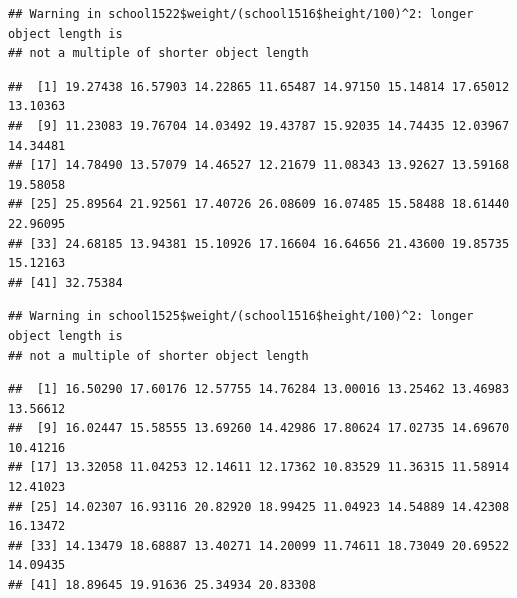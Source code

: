 \documentclass[
  12pt,
]{book}
\newenvironment{Shaded}{\begin{snugshade}}{\end{snugshade}}
\newcommand{\DecValTok}[1]{\textcolor[rgb]{0.00,0.00,0.81}{#1}}
\newcommand{\DocumentationTok}[1]{\textcolor[rgb]{0.56,0.35,0.01}{\textbf{\textit{#1}}}}
\newcommand{\NormalTok}[1]{#1}
\newcommand{\SpecialCharTok}[1]{\textcolor[rgb]{0.00,0.00,0.00}{#1}}
\begin{document}
\begin{Shaded}
\end{Shaded}

\begin{verbatim}
## Warning in school1522$weight/(school1516$height/100)^2: longer object length is
## not a multiple of shorter object length
\end{verbatim}

\begin{verbatim}
##  [1] 19.27438 16.57903 14.22865 11.65487 14.97150 15.14814 17.65012 13.10363
##  [9] 11.23083 19.76704 14.03492 19.43787 15.92035 14.74435 12.03967 14.34481
## [17] 14.78490 13.57079 14.46527 12.21679 11.08343 13.92627 13.59168 19.58058
## [25] 25.89564 21.92561 17.40726 26.08609 16.07485 15.58488 18.61440 22.96095
## [33] 24.68185 13.94381 15.10926 17.16604 16.64656 21.43600 19.85735 15.12163
## [41] 32.75384
\end{verbatim}

\begin{Shaded}
\end{Shaded}

\begin{verbatim}
## Warning in school1525$weight/(school1516$height/100)^2: longer object length is
## not a multiple of shorter object length
\end{verbatim}

\begin{verbatim}
##  [1] 16.50290 17.60176 12.57755 14.76284 13.00016 13.25462 13.46983 13.56612
##  [9] 16.02447 15.58555 13.69260 14.42986 17.80624 17.02735 14.69670 10.41216
## [17] 13.32058 11.04253 12.14611 12.17362 10.83529 11.36315 11.58914 12.41023
## [25] 14.02307 16.93116 20.82920 18.99425 11.04923 14.54889 14.42308 16.13472
## [33] 14.13479 18.68887 13.40271 14.20099 11.74611 18.73049 20.69522 14.09435
## [41] 18.89645 19.91636 25.34934 20.83308
\end{verbatim}
\end{document}
